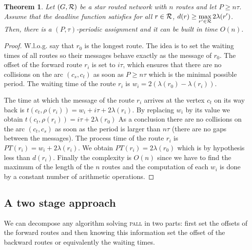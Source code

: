\documentclass[10pt, conference, letterpaper]{IEEEtran}
\newtheorem{theorem}{Theorem}
\newcommand\pall{\textsc{pall}\xspace}
\begin{document}
	 \begin{theorem}\label{th:asym}
	 Let $(G,{\cal R})$ be a star routed network with $n$ routes and let $P \geq n\tau$. Assume that the deadline function 
	 satisfies for all $r\in {\cal R}$, $d(r) \geq \displaystyle{\max_{r' \in  {\cal R}} 2\lambda(r')}$. Then, there is a $(P,\tau)$-periodic assignment and it can be built in time $O(n)$.
	 \end{theorem}
      \begin{proof}
      W.l.o.g. say that $r_0$ is the longest route. The idea is to set the waiting times of all routes so their messages behave exactly as the message of $r_0$.        
        The offset of the forward route $r_i$ is set to $i\tau$, which ensures that there are no collisions on the arc $(c_s,c_t)$ as soon as $P \geq n\tau$ which is the minimal possible period. The waiting time of the route $r_i$ is $w_i = 2(\lambda(r_{0}) - \lambda(r_{i}))$.
        
        The time at which the message of the route $r_i$ arrives at the vertex $c_t$ on its way back is $t(c_t,\rho(r_i)) = w_i + i\tau + 2\lambda(r_{i})$. By replacing $w_i$ by its value we obtain $t(c_t,\rho(r_i)) =  i\tau + 2\lambda(r_{0})$
        As a conclusion there are no collisions on the arc $(c_t,c_s)$ as soon as the period is larger than $n\tau$ (there are no gaps between the messages). The process time of the route $r_i$ is $PT(r_i) = w_i + 2\lambda(r_{i}) $. We obtain $PT(r_i) = 2\lambda(r_{0})$ which is by hypothesis less than $d(r_i)$.
	Finally the complexity is $O(n)$ since we have to find the maximum of the length of the $n$ routes and the computation of each $w_i$ is done by a constant number of arithmetic operations.
     \end{proof}
     
    
     \subsection{A two stage approach}
     
     We can decompose any algorithm solving \pall in two parts: first set the offsets of the forward routes and then knowing this information set the offset of the backward routes or equivalently the waiting times.   
     
\end{document}
